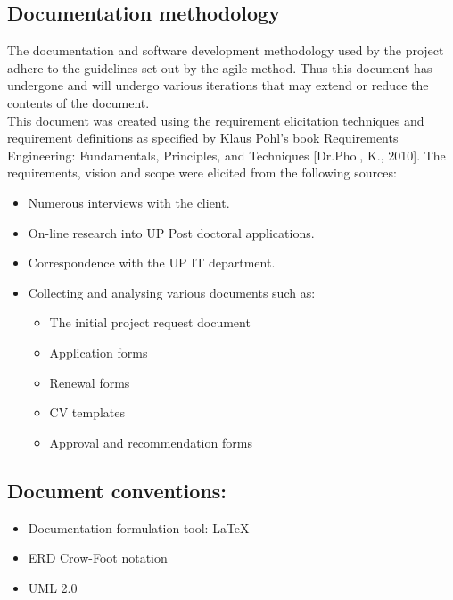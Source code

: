 \documentclass[12pt]{article}
\begin{document}
\vspace{0.2in}

\subsection{Documentation methodology}
\vspace{0.2in}
\begin{flushleft}
The documentation and software development methodology used by the project adhere to the guidelines set out by the agile method. Thus this document has undergone and will undergo various iterations that may extend or reduce the contents of the document.\\

This document was created using the requirement elicitation techniques and requirement definitions as specified by Klaus Pohl’s book Requirements Engineering: Fundamentals, Principles, and Techniques [Dr.Phol, K., 2010].
The requirements, vision and scope were elicited from the following sources:
\begin{itemize}
	\item Numerous interviews with the client.
	\item On-line research into UP Post doctoral applications.
	\item Correspondence with the UP IT department.
	\item Collecting and analysing various documents such as:
		\begin{itemize}
			\item The initial project request document
			\item Application forms
			\item Renewal forms
			\item CV templates
			\item Approval and recommendation forms
		\end{itemize}
\end{itemize}
\end{flushleft}	

\vspace{0.5in}

\subsection{Document conventions:}
\vspace{0.1in}
\begin{itemize}
\item Documentation formulation tool: LaTeX
\item ERD Crow-Foot notation
\item UML 2.0
\end{itemize}
\end{document}
